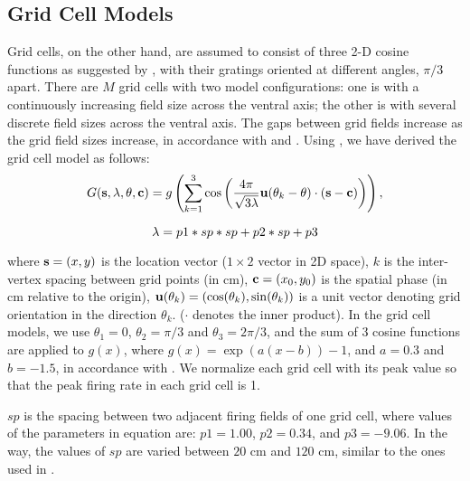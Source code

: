 \documentclass[11pt, letterpaper, onecolumn]{article}
\newcommand{\cv}{{\bf c}}
\newcommand{\sv}{{\bf s}}
\newcommand{\uv}{{\bf u}}
\begin{document}
\subsection{Grid Cell Models}
Grid cells, on the other hand, are assumed to consist of three 2-D cosine functions as suggested by \cite{Solstad:From06}, with their gratings oriented at different angles, $ \pi/3 $ apart. There are $M$ grid cells with two model configurations: one is with a continuously increasing field size across the ventral axis; the other is with several discrete field sizes across the ventral axis. The gaps between grid fields increase as the grid field sizes increase, in  accordance with \cite{Brun:Progressive08} and \cite{Hafting:Microstructure05}. Using \cite{Lyttle:Spatial13}, we have derived the grid cell model as follows:
\begin{equation}
\label{eq:gridprob}
G(\sv, \lambda, \theta, \cv) = g\left(\sum_{k=1}^{3} \cos\left(\frac{4\pi}{\sqrt{3\lambda}}\uv(\theta_{k}-\theta)\cdot(\sv-\cv)\right)\right),
\end{equation}

\begin{equation}
    \lambda = p1 * sp * sp + p2 * sp + p3 \\
\end{equation}

where $ \sv=(x,y)$ is the location vector ($1\times 2$ vector in 2D space), $ k $ is the inter-vertex spacing between grid points (in cm), $ \cv = (x_{0},y_{0}) $ is the spatial phase (in cm relative to the origin), $ \uv(\theta_{k})=(\cos(\theta_{k}), \sin(\theta_{k}))$ is a unit vector denoting grid orientation in the direction $ \theta_{k} $. ($\cdot$ denotes the inner product). In the grid cell models, we use $ \theta_{1} = 0 $, $ \theta_{2} = \pi/3 $ and $ \theta_{3} = 2\pi/3 $, and the sum of 3 cosine functions are applied to $ g(x) $, where $ g(x) = \exp(a(x-b))-1 $, and $ a=0.3 $ and $ b=-1.5 $, in accordance with \cite{Almeida:input09}. We normalize each grid cell with its peak value so that the peak firing rate in each grid cell is 1. 

$sp$ is the spacing between two adjacent firing fields of one grid cell, where values of the parameters in equation are: $p1=1.00$, $p2 = 0.34$, and $p3 = -9.06$. In the way, the values of $sp$ are varied between $20$ cm and $120$ cm, similar to the ones used in \cite{Moser:Grid14}.
\end{document}
